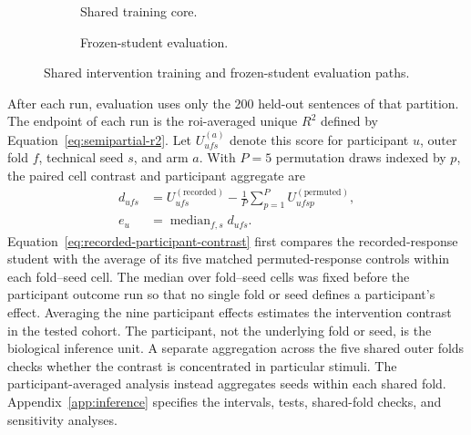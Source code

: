 \begin{figure}[tbp]
  \centering
  \begin{subfigure}{\textwidth}
    \centering
    \resizebox{\linewidth}{!}{}
    \caption{Shared training core.}
    \label{fig:training-architecture-training}
  \end{subfigure}

  \vspace{2mm}

  \begin{subfigure}{\textwidth}
    \centering
    \resizebox{\linewidth}{!}{}
    \caption{Frozen-student evaluation.}
    \label{fig:training-architecture-evaluation}
  \end{subfigure}
  \caption{Shared intervention training and frozen-student evaluation paths.}
  \label{fig:training-architecture}
\end{figure}

After each run, evaluation uses only the 200 held-out sentences of that partition.
The endpoint of each run is the \ac{roi}-averaged unique \(R^2\) defined by Equation~\ref{eq:semipartial-r2}.
Let \(U_{ufs}^{(a)}\) denote this score for participant \(u\), outer fold \(f\), technical seed \(s\), and arm \(a\).
With \(P=5\) permutation draws indexed by \(p\), the paired cell contrast and participant aggregate are
\begin{equation}
\begin{aligned}
d_{ufs}
&=
U_{ufs}^{(\mathrm{recorded})}
-
\frac{1}{P}
\sum_{p=1}^{P}
U_{ufsp}^{(\mathrm{permuted})},
\\
e_u
&=
\operatorname{median}_{f,s}d_{ufs}.
\end{aligned}
\label{eq:recorded-participant-contrast}
\end{equation}
Equation~\ref{eq:recorded-participant-contrast} first compares the recorded-response student with the average of its five matched permuted-response controls within each fold--seed cell.
The median over fold--seed cells was fixed before the participant outcome run so that no single fold or seed defines a participant's effect.
Averaging the nine participant effects estimates the intervention contrast in the tested cohort.
The participant, not the underlying fold or seed, is the biological inference unit.
A separate aggregation across the five shared outer folds checks whether the contrast is concentrated in particular stimuli.
The participant-averaged analysis instead aggregates seeds within each shared fold.
Appendix~\ref{app:inference} specifies the intervals, tests, shared-fold checks, and sensitivity analyses.

